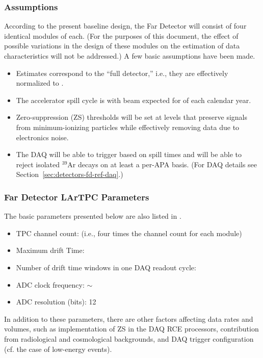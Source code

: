 \subsubsection{Assumptions}
\label{sec:detectors-sc-infrastructure-assumptions}
According to the present baseline design, the Far Detector will
consist of four identical modules of \tpcmodulemass each.  (For the
purposes of %
this document, %
the effect of possible variations in the design of these modules on the 
estimation of data characteristics will not be
addressed.) A few basic assumptions have been made.
\begin{itemize}
\item Estimates correspond to the ``full detector,''
  i.e., they are effectively normalized to \dunedetectormass.
\item The accelerator spill cycle is \beamspillcycle with beam expected
  for \beamrunfraction of each calendar year.
\item Zero-suppression (ZS) thresholds will be set at levels that preserve
  signals from minimum-ionizing particles while effectively removing
  data due to electronics noise.
\item The DAQ will be able to trigger based on spill times and will be
  able to reject isolated $^{39}$Ar decays on at least a per-APA
  basis. (For DAQ details see Section~\ref{sec:detectors-fd-ref-daq}.)
\end{itemize}

\subsubsection{Far Detector LArTPC Parameters}
The basic parameters presented below are also listed in \anxrates.
\begin{itemize}
\item TPC channel count: \dunenumberchannels (i.e., four times the
  \daqchannelspermodule channel count for each \tpcmodulemass module)
\item Maximum drift Time: \tpcdrifttime
\item Number of drift time windows in one DAQ readout cycle: \daqdriftsperreadout
\item ADC clock frequency: $\sim$\daqsamplerate
\item ADC resolution (bits): 12
\end{itemize}

In addition to these parameters, there are other factors
affecting data rates and volumes, such as implementation of ZS in the DAQ RCE processors,
contribution from radiological and cosmological backgrounds, and DAQ
trigger configuration (cf. the case of low-energy events). 

